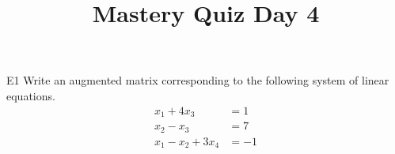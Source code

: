 \documentclass{sbgLAquiz}
\title{Mastery Quiz Day 4 }
\begin{document}
\begin{problem}{E1}
Write an augmented matrix corresponding to the following system of linear equations.
\begin{align*}
x_1+4x_3 &= 1 \\
x_2-x_3 &= 7 \\
x_1-x_2+3x_4 &= -1
\end{align*}
\end{problem}
\end{document}
